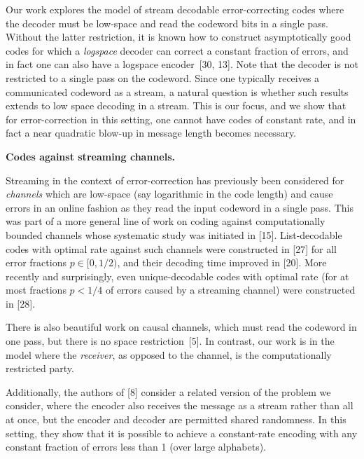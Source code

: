 Our work explores the model of stream decodable error-correcting codes where the decoder must be low-space and read the codeword bits in a single pass. Without the latter restriction, it is known how to construct asymptotically good codes for which a \emph{logspace} decoder can correct a constant fraction of errors, and in fact one can also have a logspace encoder [30, 13]. Note that the decoder is not restricted to a single pass on the codeword. Since one typically receives a communicated codeword as a stream, a natural question is whether such results extends to low space decoding in a stream.
This is our focus, and we show that for error-correction in this setting, one cannot have codes of constant rate, and in fact a near quadratic blow-up in message length becomes necessary.\par





\par\medskip\noindent\textbf{Codes against streaming channels.}\par




Streaming in the context of error-correction has previously been considered for \emph{channels} which are low-space (say logarithmic in the code length) and cause errors in an online fashion as they read the input codeword in a single pass. This was part of a more general line of work on coding against computationally bounded channels whose systematic study was initiated in [15]. List-decodable codes with optimal rate against such channels were constructed in [27] for all error fractions $p\in[0,1/2)$, and their decoding time improved in [20]. More recently and surprisingly, even unique-decodable codes with optimal rate (for at most fractions $p<1/4$ of errors caused by a streaming channel) were constructed in [28].\par




There is also beautiful work on causal channels, which must read the codeword in one pass, but there is no space restriction [5]. In contrast, our work is in the model where the \emph{receiver}, as opposed to the channel, is the computationally restricted party.\par




Additionally, the authors of [8] consider a related version of the problem we consider, where the encoder also receives the message as a stream rather than all at once, but the encoder and decoder are permitted shared randomness. In this setting, they show that it is possible to achieve a constant-rate encoding with any constant fraction of errors less than 1 (over large alphabets).\par





